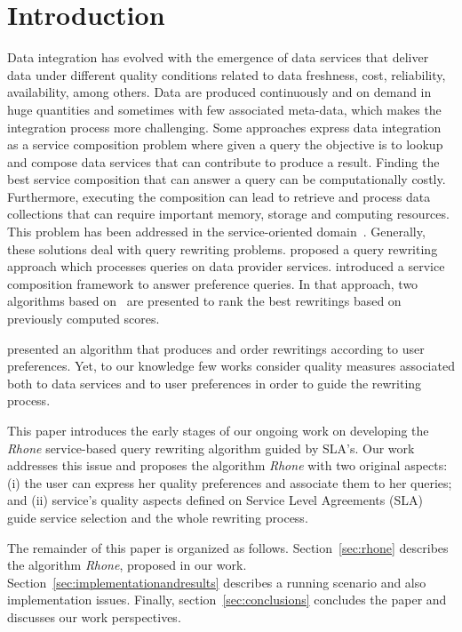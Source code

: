 \section{Introduction}
Data integration
has evolved with the emergence of data services that deliver data under
different quality conditions related to data freshness, cost, reliability,
availability, among others. Data are produced continuously and on demand in huge
quantities and sometimes with few associated meta-data, which makes the
integration process more challenging. Some approaches express data integration
as a service composition problem where given a query the objective is to lookup and compose data services that can contribute to produce a result. Finding the best service composition that can answer a query can be computationally costly. Furthermore,  executing the composition can lead to retrieve and process data collections that can require important memory, storage and computing resources.
This problem has  been addressed in the service-oriented domain~\cite{Barhamgi2010,Benouaret2011,ba2014}.
Generally, these solutions deal with query rewriting problems.
\cite{Barhamgi2010} proposed a query rewriting approach which processes queries
on data provider services. \cite{Benouaret2011} introduced a service composition
framework to answer preference queries. In that approach, two algorithms based
on~\cite{Barhamgi2010} are presented to rank the best rewritings based on previously computed scores.

\cite{ba2014} presented an algorithm that produces and order rewritings
according to user preferences. Yet, to our knowledge few works consider quality
measures associated both to data services and to user preferences in order to
guide the rewriting process. 


This paper introduces the early stages of our
ongoing work on developing the \textit{Rhone} service-based query rewriting
algorithm guided by SLA's. Our work addresses this issue and proposes the 
algorithm \textit{Rhone} with two original aspects: (i) the user can express
her quality preferences and associate them to her queries; and (ii)  service's
quality aspects defined on Service Level Agreements (SLA) guide service
selection and  the whole rewriting process.

The remainder of this paper is organized as follows. Section~\ref{sec:rhone}
describes the algorithm \textit{Rhone}, proposed in our work.
Section~\ref{sec:implementationandresults} describes a running scenario and also
implementation issues.
Finally, section~\ref{sec:conclusions} concludes the paper and discusses our work perspectives.
